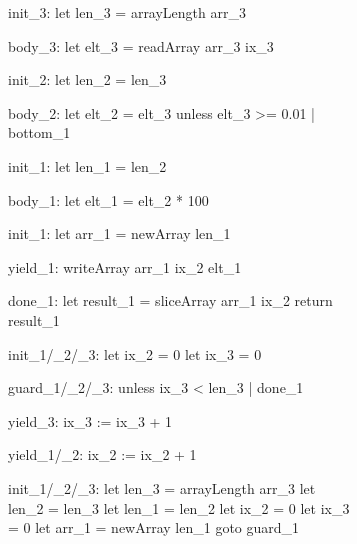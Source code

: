 \documentclass[preamble.tex]{subfiles}
\begin{document}
\providecommand\CommentsColor{\color{MidnightBlue}}
\providecommand\WhatCombinator[1]{\enrule[\CommentsColor]{0.95\textwidth}{#1}}



\begin{figure}
\vspace*{-1cm}
\hspace*{-0.5cm}
\begin{subfigure}{.55\textwidth}
\begin{loopcode}[%
    literate=
        {_1}{{\sub{map}}}3  %
        {_2}{{\sub{filt}}}2 %
        {_3}{{\sub{mfst}}}3 %
]
init_3:
  let len_3 = arrayLength arr_3

body_3:
  let elt_3 = readArray arr_3 ix_3

init_2:
  let len_2 = len_3

body_2:
  let elt_2 = elt_3
  unless elt_3 >= 0.01 | bottom_1

init_1:
  let len_1 = len_2

body_1:
  let elt_1 = elt_2 * 100

init_1:
  let arr_1 = newArray len_1

yield_1:
  writeArray arr_1 ix_2 elt_1

done_1:
  let result_1 = sliceArray arr_1 ix_2
  return result_1

init_1/_2/_3:
  let ix_2 = 0
  let ix_3 = 0

guard_1/_2/_3:
  unless ix_3 < len_3 | done_1

yield_3:
  ix_3 := ix_3 + 1

yield_1/_2:
  ix_2 := ix_2 + 1
\end{loopcode}
\end{subfigure}%
\begin{subfigure}{.55\textwidth}
\begin{loopcode}[%
    literate=
        {_1}{{\sub{map}}}3  %
        {_2}{{\sub{filt}}}2 %
        {_3}{{\sub{mfst}}}3 %
]
init_1/_2/_3:
  let len_3 = arrayLength arr_3
  let len_2 = len_3
  let len_1 = len_2
  let ix_2 = 0
  let ix_3 = 0
  let arr_1 = newArray len_1
  goto guard_1


\end{loopcode}
\end{subfigure}
\end{figure}
\end{document}
